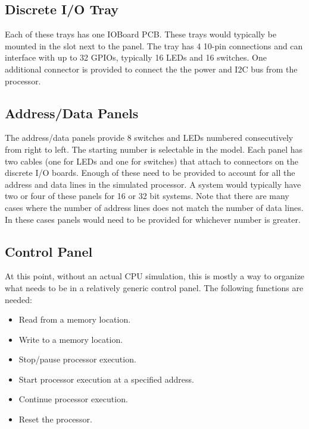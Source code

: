 \documentclass[10pt, openany]{book}
\begin{document}
\subsection{Discrete I/O Tray}
Each of these trays has one IOBoard PCB.  These trays would typically be mounted in the slot next to the panel.  The tray has 4 10-pin connections and can interface with up to 32 GPIOs, typically 16 LEDs and 16 switches.  One additional connector is provided to connect the the power and I2C bus from the processor.

\subsection{Address/Data Panels}
The address/data panels provide 8 switches and LEDs numbered consecutively from right to left.  The starting number is selectable in the model.  Each panel has two cables (one for LEDs and one for switches) that attach to connectors on the discrete I/O boards.  Enough of these need to be provided to account for all the address and data lines in the simulated processor.  A system would typically have two or four of these panels for 16 or 32 bit systems.  Note that there are many cases where the number of address lines does not match the number of data lines.  In these cases panels would need to be provided for whichever number is greater.

\subsection{Control Panel}
At this point, without an actual CPU simulation, this is mostly a way to organize what needs to be in a relatively generic control panel.  The following functions are needed:
\begin{itemize}
  \item Read from a memory location.
  \item Write to a memory location.
  \item Stop/pause processor execution.
  \item Start processor execution at a specified address.
  \item Continue processor execution.
  \item Reset the processor.
\end{itemize}
\end{document}
